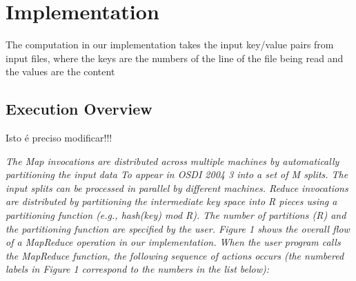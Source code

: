 \section {Implementation}

The computation in our implementation takes the input key/value pairs from input files, where the keys are the numbers of the line of the file being read and the values are the content

\subsection {Execution Overview}


{\LARGE{Isto é preciso modificar!!!}}

 \it\tiny
The Map invocations are distributed across multiple
machines by automatically partitioning the input data
To appear in OSDI 2004 3
into a set of M splits. The input splits can be processed
in parallel by different machines. Reduce invocations
are distributed by partitioning the intermediate key
space into R pieces using a partitioning function (e.g.,
hash(key) mod R). The number of partitions (R) and
the partitioning function are specified by the user.
Figure 1 shows the overall flow of a MapReduce operation
in our implementation. When the user program
calls the MapReduce function, the following sequence
of actions occurs (the numbered labels in Figure 1 correspond
to the numbers in the list below):

